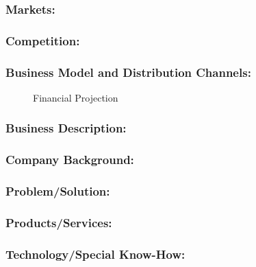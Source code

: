 \begin{minipage}[t][\textheight][t]{\textwidth}
\begin{multicols}{2}
\begin{small}
\begin{minipage}[t][\textheight][t]{.45\textwidth}
		\subsubsection*{Markets:}
		\subsubsection*{Competition:}
		\subsubsection*{Business Model and Distribution Channels:}
	\end{minipage}
	\begin{minipage}[r][\textheight][r]{.45\textwidth}
			\begin{figure}[H]
				
				\label{fig:forecast}
				\caption{Financial Projection}
			\end{figure}		
		\subsubsection*{Business Description:}
		\subsubsection*{Company Background:}
		\subsubsection*{Problem/Solution:}
		\subsubsection*{Products/Services:}
		\subsubsection*{Technology/Special Know-How:}
	\end{minipage}		
\end{small}		
\end{multicols}
\end{minipage}		
